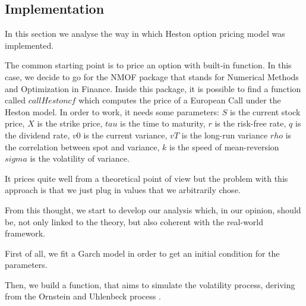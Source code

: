 \documentclass[paper=a4, fontsize=12pt]{scrartcl} %
\numberwithin{equation}{section}
\begin{document}
\subsection{Implementation}
In this section we analyse the way in which Heston option pricing model was implemented. \par
The common starting point is to price an option with built-in function. In this case, we decide to go for the NMOF package that stands for Numerical Methods and Optimization in Finance. Inside this package, it is possible to find a function called  $callHestoncf$ which computes the price of a European Call under the Heston model. In order to work, it needs some parameters: $S$ is the current stock price, $X$ is the strike price, $tau$ is the time to maturity, $r$ is the risk-free rate, $q$ is the dividend rate, $v0$ is the current variance, $vT$ is the long-run variance $rho$ is the correlation between spot and variance, $k$ is the speed of mean-reversion $sigma$ is the volatility of variance. \par
It prices quite well from a theoretical point of view but the problem with this approach is that we just plug in values that we arbitrarily chose. \par
From this thought, we start to develop our analysis which, in our opinion, should be, not only linked to the theory, but also coherent with the real-world framework. \par
First of all, we fit a Garch model \cite{bollerslev86} in order to get an initial condition for the parameters.\par
Then, we build a function, that aims to simulate the volatility process, deriving from the Ornstein and Uhlenbeck process \cite{ou}.
\end{document}
